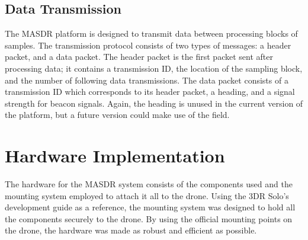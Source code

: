 {\subsection{Data Transmission}
The MASDR platform is designed to transmit data between processing blocks of samples. The transmission protocol consists of two types of messages: a header packet, and a data packet. The header packet is the first packet sent after processing data; it contains a transmission ID, the location of the sampling block, and the number of following data transmissions. The data packet consists of a transmission ID which corresponds to its header packet, a heading, and a signal strength for beacon signals. Again, the heading is unused in the current version of the platform, but a future version could make use of the field.

\section{Hardware Implementation}
The hardware for the MASDR system consists of the components used and the mounting system employed to attach it all to the drone. Using the 3DR Solo’s development guide as a reference, the mounting system was designed to hold all the components securely to the drone. By using the official mounting points on the drone, the hardware was made as robust and efficient as possible.
}
